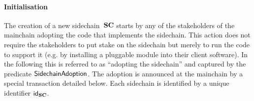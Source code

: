 \paragraph{Initialisation}

The creation of a new sidechain~$\mathbf{SC}$ starts by any of the stakeholders of the
mainchain adopting the code that implements the sidechain. This action does not
require the stakeholders to put stake on the sidechain but merely to run the
code to support it (e.g. by installing a pluggable module into their client
software). In the following this is referred to as ``adopting the sidechain''
and captured by the predicate $\mathsf{SidechainAdoption}$.
The adoption is  announced at the mainchain by a special transaction
detailed below.  Each sidechain is identified by a unique identifier $\mathsf{id}_{\mathbf{SC}}$.

